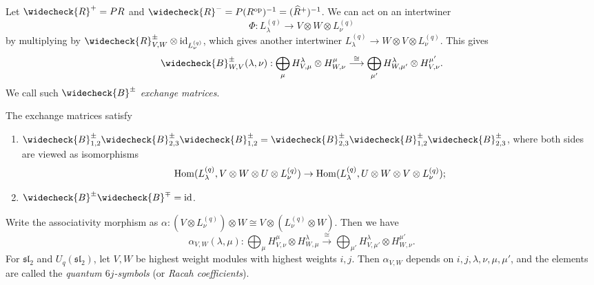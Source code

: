 \begin{remark}
  Let $\widecheck{R}^+ = PR$
  and $\widecheck{R}^- = P(R^{\mathrm{op}})^{-1} = (\widehat{R}^+)^{-1}$.
  We can act on an intertwiner
  \[
    \Phi
    : L^{(q)}_\lambda
    \longrightarrow V \otimes W \otimes L^{(q)}_\nu
  \]
  by multiplying by 
  $\widecheck{R}^{\pm}_{V, W} \otimes {\id_{L^{(q)}_\nu}}$,
  which gives another intertwiner
  $L^{(q)}_\lambda \to W \otimes V \otimes L^{(q)}_\nu$.
  This gives
  \[
    \widecheck{B}^{\pm}_{W, V}
    (\lambda, \nu)
    : \bigoplus_{\mu} H_{V, \mu}^\lambda \otimes H_{W, \nu}^\mu
    \overset{\cong}\longrightarrow
    \bigoplus_{\mu'} H_{W, \mu'}^\lambda \otimes H_{V, \nu}^{\mu'}.
  \]
  We call such
  $\widecheck{B}^{\pm}$
  \emph{exchange matrices}.
\end{remark}

\begin{prop}
  The exchange matrices satisfy
  \begin{enumerate}
    \item $\widecheck{B}^{\pm}_{1, 2} \widecheck{B}^{\pm}_{2, 3} \widecheck{B}^{\pm}_{1, 2} = \widecheck{B}^{\pm}_{2, 3} \widecheck{B}^{\pm}_{1, 2} \widecheck{B}^{\pm}_{2, 3}$,
      where both sides are viewed as
      isomorphisms
      \[\operatorname{Hom}(L^{(q)}_\lambda, V \otimes W \otimes U \otimes L^{(q)}_\nu) \to \operatorname{Hom}(L^{(q)}_\lambda, U \otimes W \otimes V \otimes L^{(q)}_\nu);\]
    \item $\widecheck{B}^{\pm} \widecheck{B}^{\mp} = \id$.
  \end{enumerate}
\end{prop}

\begin{remark}
  Write the associativity morphism as
  $\alpha : (V \otimes L^{(q)}_\nu) \otimes W \cong V \otimes (L^{(q)}_\nu \otimes W)$.
  Then we have
  \[
    \alpha_{V, W}(\lambda, \mu)
    : \bigoplus_{\mu} H_{V, \nu}^\mu
    \otimes H_{W, \mu}^\lambda
    \overset{\cong}{\longrightarrow}
    \bigoplus_{\mu'} H_{V, \mu'}^{\lambda}
    \otimes H_{W, \nu}^{\mu'}.
  \]
  For $\mathfrak{sl}_2$ and
  $U_q(\mathfrak{sl}_2)$, let
  $V, W$ be highest weight modules
  with highest weights $i, j$.
  Then $\alpha_{V, W}$ depends on
  $i, j, \lambda, \nu, \mu, \mu'$, and the
  elements are called the
  \emph{quantum $6j$-symbols}
  (or \emph{Racah coefficients}).
\end{remark}

